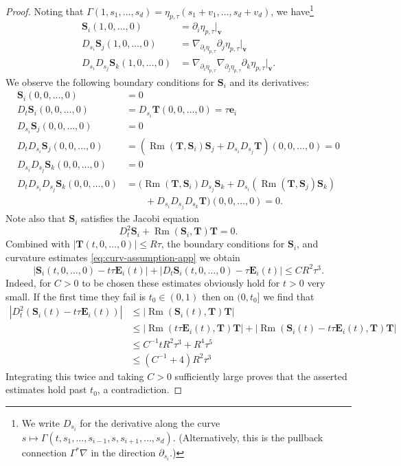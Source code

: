 \documentclass[11pt, letterpaper, reqno]{amsart}
\numberwithin{equation}{section}
\theoremstyle{remark}
\newcommand{\mbfE}{\mathbf{E}}
\newcommand{\mbfS}{\mathbf{S}}
\newcommand{\mbfT}{\mathbf{T}}
\newcommand{\mbfe}{\mathbf{e}}
\newcommand{\mbfv}{\mathbf{v}}
\newcommand{\Rm}{\operatorname{Rm}}
\begin{document}
\begin{proof}
Noting that $\Gamma(1,s_1,\dots,s_d) = \eta_{p,\tau}(s_1+v_1,\dots,s_d+v_d)$, we have\footnote{We write $D_{s_i}$ for the derivative along the curve $s \mapsto \Gamma(t,s_1,\dots,s_{i-1},s,s_{i+1},\dots,s_d)$. (Alternatively, this is the pullback connection $\Gamma^*\nabla$ in the direction $\partial_{s_i}$.)}
\begin{align*}
\mbfS_i(1,0,\dots,0) & = \partial_{i} \eta_{p,\tau}|_{\mbfv}\\
D_{s_i} \mbfS_j(1,0,\dots,0)&  = \nabla_{\partial_i \eta_{p,\tau}} \partial_j \eta_{p,\tau}|_\mbfv\\
D_{s_i}D_{s_j} \mbfS_k(1,0,\dots,0) & = \nabla_{\partial_i \eta_{p,\tau}} \nabla_{\partial_j \eta_{p,\tau}} \partial_k \eta_{p,\tau}|_\mbfv.
\end{align*}
We observe the following boundary conditions for $\mbfS_i$ and its derivatives:
\begin{align*}
\mbfS_i(0,0,\dots,0) & = 0 \\
D_t\mbfS_i(0,0,\dots,0) & = D_{s_i} \mbfT(0,0,\dots,0) = \tau \mbfe_i \\
D_{s_i} \mbfS_j(0,0,\dots,0) & = 0\\
D_t D_{s_i} \mbfS_j(0,0,\dots,0) & = (\Rm(\mbfT, \mbfS_i)\mbfS_j + D_{s_i} D_{s_j} \mbfT)(0,0,\dots,0) = 0\\
D_{s_i} D_{s_j} \mbfS_k(0,0,\dots,0) & = 0 \\
D_t D_{s_i} D_{s_j} \mbfS_k(0,0,\dots,0) & 
= (\Rm(\mbfT, \mbfS_i) D_{s_j}\mbfS_k  + D_{s_i}(\Rm(\mbfT,\mbfS_j)\mbfS_k)\\
&\qquad + D_{s_i}D_{s_j}D_{s_k}\mbfT)(0,0,\dots,0) = 0. 
\end{align*}
Note also that $\mbfS_i$ satisfies the Jacobi equation
\[
D^2_t \mbfS_i + \Rm(\mbfS_i,\mbfT)\mbfT = 0.
\]
Combined with $|\mbfT(t,0,\dots,0)|\leq R \tau$, the boundary conditions for $\mbfS_i$, and curvature estimates \eqref{eq:curv-assumption-app} we obtain 
\begin{equation}\label{eq:norm-coord-app-est-0th-order-S_i}
|\mbfS_i(t,0,\dots,0) - t \tau \mbfE_i(t)| + |D_t\mbfS_i(t,0,\dots,0) - \tau \mbfE_i(t)| \leq CR^2\tau^3. 
\end{equation}
Indeed, for $C>0$ to be chosen these estimates obviously hold for $t>0$ very small. If the first time they fail is $t_0 \in (0,1)$ then on $(0,t_0]$ we find that
\begin{align*}
 | D_t^2(\mbfS_i(t) - t\tau \mbfE_i(t))| & \leq \lvert\Rm(\mbfS_i(t),\mbfT)\mbfT\rvert \\
& \leq \lvert\Rm(t\tau \mbfE_i(t),\mbfT)\mbfT\rvert + \lvert\Rm(\mbfS_i(t)-t\tau \mbfE_i(t),\mbfT)\mbfT\rvert \\
& \leq C^{-1} t R^2 \tau^3 + R^4 \tau^5 \\
& \leq (C^{-1} + 4)R^2 \tau^3
\end{align*}
Integrating this twice and taking $C>0$ sufficiently large proves that the asserted estimates hold past $t_0$, a contradiction. 


\end{proof}
\end{document}
